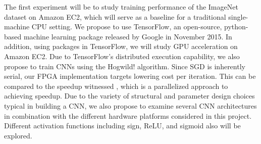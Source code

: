The first experiment will be to study training performance of the ImageNet dataset on Amazon EC2, which will serve as a baseline for a traditional single-machine CPU setting.  We propose to use TensorFlow, an open-source, python-based machine learning package released by Google in November 2015.  In addition, using packages in TensorFlow, we will study GPU acceleration on Amazon EC2.  Due to TensorFlow’s distributed execution capability, we also propose to train CNNs using the Hogwild! algorithm.  Since SGD is inherently serial, our FPGA implementation targets lowering cost per iteration.  This can be compared to the speedup witnessed {}, which is a parallelized approach to achieving speedup.  Due to the variety of structural and parameter design choices typical in building a CNN, we also propose to examine several CNN architectures in combination with the different hardware platforms considered in this project.  Different activation functions including sign, ReLU, and sigmoid also will be explored.
